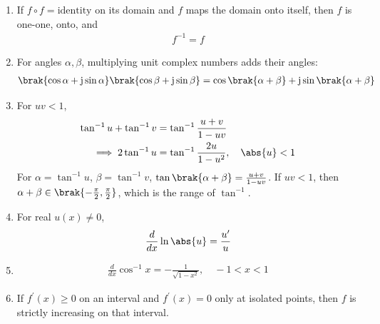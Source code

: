 \begin{enumerate}[label=\thesubsection.\arabic*, ref=\thesubsection.\theenumi]
\medskip
\solution In homogeneous coordinates,
\begin{align}
	\vec{M}\myvec{x \\ 1} &= \myvec{ax+b \\ cx+d} \notag
	\\
	&= \brak{cx+d}\myvec{f(x) \\ 1}
\end{align}
so applying $f_{\vec{N}}$ followed by $f_{\vec{M}}$ multiplies the column vector by $\vec{N}$ and then by $\vec{M}$, up to non-zero scalars, which do not change the ratio of the entries.
\item If $f\circ f = \text{identity}$ on its domain and $f$ maps the domain onto itself, then $f$ is one-one, onto, and
\begin{align}
	f^{-1} = f \label{eq:EE26BTECH11205-involution}
\end{align}
\item For angles $\alpha, \beta$, multiplying unit complex numbers adds their angles:
\begin{align}
	\brak{\cos\alpha + \mathrm{j}\sin\alpha}\brak{\cos\beta + \mathrm{j}\sin\beta} = \cos\brak{\alpha+\beta} + \mathrm{j}\sin\brak{\alpha+\beta} \label{eq:EE26BTECH11205-euler-mult}
\end{align}
\item For $uv < 1$,
\begin{align}
	\tan^{-1}u + \tan^{-1}v &= \tan^{-1}\frac{u+v}{1-uv} \label{eq:EE26BTECH11205-arctan-add}
	\\
	\implies 2\tan^{-1}u &= \tan^{-1}\frac{2u}{1-u^2}, \quad \abs{u} < 1 \label{eq:EE26BTECH11205-arctan-double}
\end{align}
\solution For $\alpha = \tan^{-1}u$, $\beta = \tan^{-1}v$, $\tan\brak{\alpha+\beta} = \frac{u+v}{1-uv}$. If $uv<1$, then $\alpha+\beta \in \brak{-\frac{\pi}{2},\frac{\pi}{2}}$, which is the range of $\tan^{-1}$.
\item For real $u(x) \neq 0$,
\begin{align}
	\frac{d}{dx}\ln\abs{u} = \frac{u^{\prime}}{u} \label{eq:EE26BTECH11205-logdiff}
\end{align}
\item
\begin{align}
	\frac{d}{dx}\cos^{-1}x = -\frac{1}{\sqrt{1-x^2}}, \quad -1<x<1 \label{eq:EE26BTECH11205-dacos}
\end{align}
\item If $f^{\prime}(x) \ge 0$ on an interval and $f^{\prime}(x) = 0$ only at isolated points, then $f$ is strictly increasing on that interval. \label{eq:EE26BTECH11205-monotone}

\end{enumerate}
